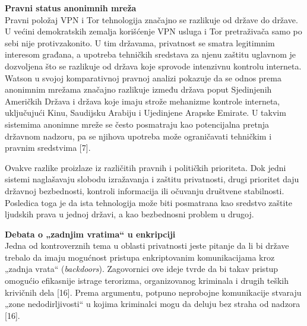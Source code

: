 \documentclass[
]{article}
\begin{document}
\textbf{Pravni status anonimnih mreža}\\
Pravni položaj VPN i Tor tehnologija značajno se razlikuje od države do
države. U većini demokratskih zemalja korišćenje VPN usluga i Tor
pretraživača samo po sebi nije protivzakonito. U tim državama,
privatnost se smatra legitimnim interesom građana, a upotreba tehničkih
sredstava za njenu zaštitu uglavnom je dozvoljena što se razlikuje od
država koje sprovode intenzivnu kontrolu interneta. Watson u svojoj
komparativnoj pravnoj analizi pokazuje da se odnos prema anonimnim
mrežama značajno razlikuje između država poput Sjedinjenih Američkih
Država i država koje imaju strože mehanizme kontrole interneta,
uključujući Kinu, Saudijsku Arabiju i Ujedinjene Arapske Emirate. U
takvim sistemima anonimne mreže se često posmatraju kao potencijalna
pretnja državnom nadzoru, pa se njihova upotreba može ograničavati
tehničkim i pravnim sredstvima [7].

Ovakve razlike proizlaze iz različitih pravnih i političkih prioriteta.
Dok jedni sistemi naglašavaju slobodu izražavanja i zaštitu privatnosti,
drugi prioritet daju državnoj bezbednosti, kontroli informacija ili
očuvanju društvene stabilnosti. Posledica toga je da ista tehnologija
može biti posmatrana kao sredstvo zaštite ljudskih prava u jednoj
državi, a kao bezbednosni problem u drugoj.

\textbf{Debata o „zadnjim vratima`` u enkripciji}\\
Jedna od kontroverznih tema u oblasti privatnosti jeste pitanje da li bi države
trebalo da imaju mogućnost pristupa enkriptovanim komunikacijama kroz
„zadnja vrata`` (\emph{backdoors}). Zagovornici ove ideje tvrde da bi takav
pristup omogućio efikasnije istrage terorizma, organizovanog kriminala i
drugih teških krivičnih dela [16]. Prema argumentu, potpuno
neprobojne komunikacije stvaraju „zone nedodirljivosti`` u kojima
kriminalci mogu da deluju bez straha od nadzora [16].
\end{document}

